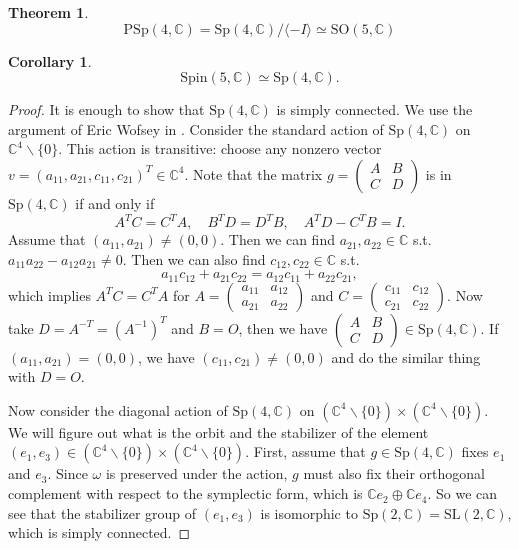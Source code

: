 \documentclass{article}
\newtheorem{theorem}{Theorem}
\newtheorem{corollary}{Corollary}
\newcommand{\SO}{\mathrm{SO}}
\newcommand{\SL}{\mathrm{SL}}
\newcommand{\Spin}{\mathrm{Spin}}
\newcommand{\Sp}{\mathrm{Sp}}
\begin{document}
\begin{theorem}
$$\mathrm{PSp}(4, \mathbb{C}) = \Sp(4, \mathbb{C})/\langle -I\rangle \simeq \SO(5, \mathbb{C})$$
\end{theorem}
\begin{corollary}
$$\Spin(5, \mathbb{C})\simeq \Sp(4, \mathbb{C}).$$
\end{corollary}
\begin{proof}
It is enough to show that $\Sp(4, \mathbb{C})$ is simply connected. We use the argument of Eric Wofsey in \cite{mse}. Consider the standard action of $\Sp(4, \mathbb{C})$ on $\mathbb{C}^{4}\backslash \{0\}$. This action is transitive: choose any nonzero vector $v = (a_{11}, a_{21}, c_{11}, c_{21})^{T}\in\mathbb{C}^{4}$. 
Note that the matrix $g = \left(\begin{smallmatrix} A&B\\C&D\end{smallmatrix}\right)$ is in $\Sp(4, \mathbb{C})$ if and only if 
$$
A^{T}C = C^{T}A, \quad B^{T}D=D^{T}B, \quad A^{T}D-C^{T}B=I. 
$$
Assume that $(a_{11}, a_{21})\neq (0, 0)$. Then we can find $a_{21}, a_{22}\in \mathbb{C}$ s.t. $a_{11}a_{22}-a_{12}a_{21}\neq 0$. Then we can also find $c_{12}, c_{22}\in \mathbb{C}$ s.t. $$a_{11}c_{12}+a_{21}c_{22}=a_{12}c_{11}+a_{22}c_{21},$$
which implies $A^{T}C = C^{T}A$ for $A = \left(\begin{smallmatrix}a_{11}&a_{12} \\ a_{21}&a_{22}\end{smallmatrix}\right)$ and $C = \left(\begin{smallmatrix}c_{11}&c_{12}\\c_{21}&c_{22}\end{smallmatrix}\right)$. 
Now take $D = A^{-T} = (A^{-1})^{T}$ and $B=O$, then we have $\left(\begin{smallmatrix}A&B\\C&D\end{smallmatrix}\right)\in \Sp(4, \mathbb{C})$. If $(a_{11}, a_{21})=(0, 0)$, we have $(c_{11}, c_{21})\neq (0, 0)$ and do the similar thing with $D=O$. 

Now consider the diagonal action of $\Sp(4, \mathbb{C})$ on $(\mathbb{C}^{4}\backslash\{0\})\times (\mathbb{C}^{4}\backslash\{0\})$. We will figure out what is the orbit and the stabilizer of the element $(e_{1}, e_{3})\in (\mathbb{C}^{4}\backslash\{0\})\times(\mathbb{C}^{4}\backslash\{0\})$. 
First, assume that $g\in \Sp(4, \mathbb{C})$ fixes $e_{1}$ and $e_{3}$. 
Since $\omega$ is preserved under the action, $g$ must also fix their orthogonal complement with respect to the symplectic form, which is $\mathbb{C}e_{2}\oplus \mathbb{C}e_{4}$. 
So we can see that the stabilizer group of $(e_{1}, e_{3})$ is isomorphic to $\Sp(2, \mathbb{C}) =\SL(2, \mathbb{C})$, which is simply connected. 


\end{proof}
\end{document}
